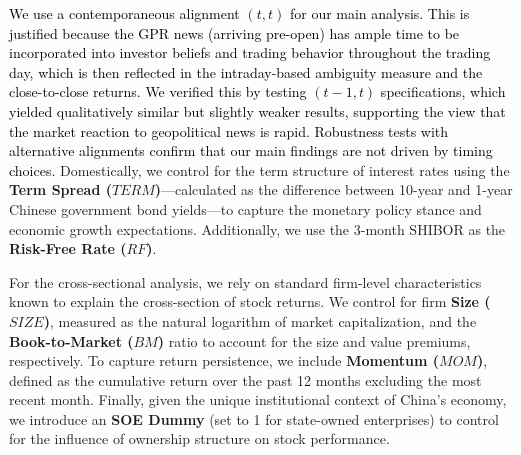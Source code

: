 \documentclass[preprint,12pt,authoryear]{elsarticle}
\begin{document}
\textcolor{black}{We use a contemporaneous alignment $(t, t)$ for our main analysis. This is justified because the GPR news (arriving pre-open) has ample time to be incorporated into investor beliefs and trading behavior throughout the trading day, which is then reflected in the intraday-based ambiguity measure and the close-to-close returns. We verified this by testing $(t-1, t)$ specifications, which yielded qualitatively similar but slightly weaker results, supporting the view that the market reaction to geopolitical news is rapid. Robustness tests with alternative alignments confirm that our main findings are not driven by timing choices.} Domestically, we control for the term structure of interest rates using the \textbf{Term Spread ($TERM$)}—calculated as the difference between 10-year and 1-year Chinese government bond yields—to capture the monetary policy stance and economic growth expectations. Additionally, we use the 3-month SHIBOR as the \textbf{Risk-Free Rate ($RF$)}.

For the cross-sectional analysis, we rely on standard firm-level characteristics known to explain the cross-section of stock returns. We control for firm \textbf{Size ($SIZE$)}, measured as the natural logarithm of market capitalization, and the \textbf{Book-to-Market ($BM$)} ratio to account for the size and value premiums, respectively. To capture return persistence, we include \textbf{Momentum ($MOM$)}, defined as the cumulative return over the past 12 months excluding the most recent month. Finally, given the unique institutional context of China's economy, we introduce an \textbf{SOE Dummy} (set to 1 for state-owned enterprises) to control for the influence of ownership structure on stock performance.
\end{document}
